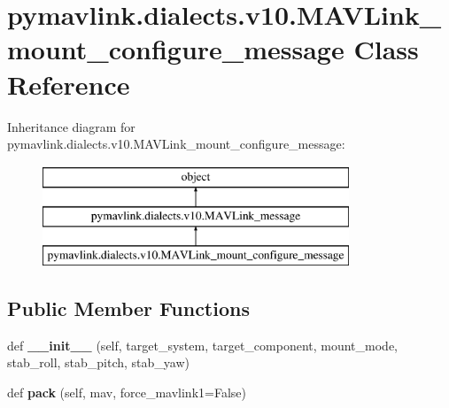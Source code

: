 \hypertarget{classpymavlink_1_1dialects_1_1v10_1_1MAVLink__mount__configure__message}{}\section{pymavlink.\+dialects.\+v10.\+M\+A\+V\+Link\+\_\+mount\+\_\+configure\+\_\+message Class Reference}
\label{classpymavlink_1_1dialects_1_1v10_1_1MAVLink__mount__configure__message}
Inheritance diagram for pymavlink.\+dialects.\+v10.\+M\+A\+V\+Link\+\_\+mount\+\_\+configure\+\_\+message\+:\begin{figure}[H]
\begin{center}
\leavevmode
\includegraphics[height=3.000000cm]{classpymavlink_1_1dialects_1_1v10_1_1MAVLink__mount__configure__message}
\end{center}
\end{figure}
\subsection*{Public Member Functions}
\begin{DoxyCompactItemize}
\item 
\mbox{\label{classpymavlink_1_1dialects_1_1v10_1_1MAVLink__mount__configure__message_abae6132d77afb1a28dcbad48e6cbd42b}} 
def {\bfseries \+\_\+\+\_\+init\+\_\+\+\_\+} (self, target\+\_\+system, target\+\_\+component, mount\+\_\+mode, stab\+\_\+roll, stab\+\_\+pitch, stab\+\_\+yaw)
\item 
\mbox{\label{classpymavlink_1_1dialects_1_1v10_1_1MAVLink__mount__configure__message_ad882e1ac218cde81cee9beb3f794fc27}} 
def {\bfseries pack} (self, mav, force\+\_\+mavlink1=False)
\end{DoxyCompactItemize}
